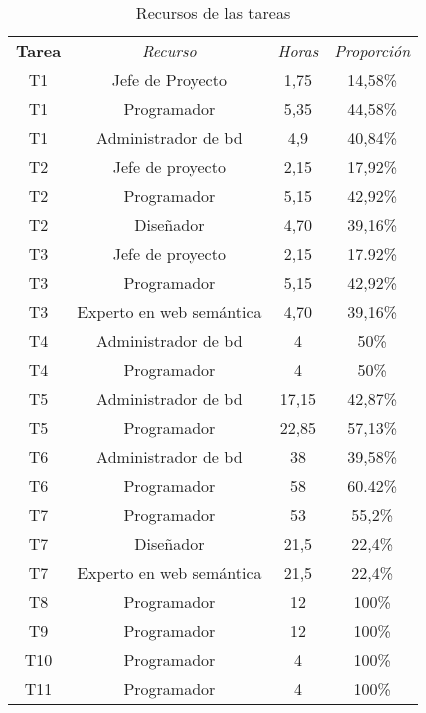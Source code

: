 \begin{table}[htp]
	\centering
	\caption{Recursos de las tareas}\label{tab:recursos}
	\begin{tabular}{cccc}
		\toprule
		\textbf{Tarea} & \emph{Recurso} & \emph{Horas} & \emph{Proporción}\\
		T1 & Jefe de Proyecto & 1,75 & 14,58\%\\
		T1 & Programador & 5,35 & 44,58\%\\
		T1 & Administrador de \acrshort{bd} & 4,9 & 40,84\%\\
		T2 & Jefe de proyecto & 2,15 & 17,92\%\\
		T2 & Programador & 5,15 & 42,92\%\\
		T2 & Diseñador & 4,70 & 39,16\%\\
		T3 & Jefe de proyecto & 2,15 & 17.92\%\\
		T3 & Programador & 5,15 & 42,92\%\\
		T3 & Experto en web semántica & 4,70 & 39,16\%\\
		T4 & Administrador de \acrshort{bd} & 4 & 50\%\\
		T4 & Programador & 4 & 50\%\\
		T5 & Administrador de \acrshort{bd} & 17,15 & 42,87\%\\
		T5 & Programador & 22,85 & 57,13\%\\
		T6 & Administrador de \acrshort{bd} & 38 & 39,58\%\\
		T6 & Programador & 58 & 60.42\%\\
		T7 & Programador & 53 & 55,2\%\\
		T7 & Diseñador & 21,5 & 22,4\%\\
		T7 & Experto en web semántica & 21,5 & 22,4\%\\
		T8 & Programador & 12 & 100\%\\
		T9 & Programador & 12 & 100\%\\
		T10 & Programador & 4 & 100\%\\
		T11 & Programador & 4 & 100\%\\
		\bottomrule
    \end{tabular}
\end{table}